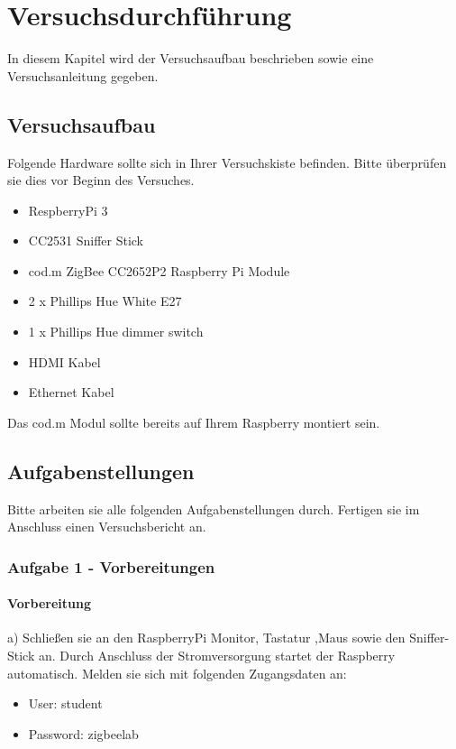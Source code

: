 \chapter{Versuchsdurchführung}

In diesem Kapitel wird der Versuchsaufbau beschrieben sowie eine Versuchsanleitung gegeben.

\section{Versuchsaufbau}

Folgende Hardware sollte sich in Ihrer Versuchskiste befinden. Bitte überprüfen sie dies vor Beginn des Versuches.

\begin{itemize}
    \item RespberryPi 3
    \item CC2531 Sniffer Stick
    \item cod.m ZigBee CC2652P2 Raspberry Pi Module
    \item 2 x Phillips Hue White E27
    \item 1 x Phillips Hue dimmer switch
    \item HDMI Kabel
    \item Ethernet Kabel
\end{itemize}

Das cod.m Modul sollte bereits auf Ihrem Raspberry montiert sein. 

\section{Aufgabenstellungen}

Bitte arbeiten sie alle folgenden Aufgabenstellungen durch. Fertigen sie im Anschluss einen Versuchsbericht an.

\subsection{Aufgabe 1 - Vorbereitungen}

\subsubsection{Vorbereitung}
a) Schließen sie an den RaspberryPi Monitor, Tastatur ,Maus sowie den Sniffer-Stick an. Durch Anschluss der
Stromversorgung startet der Raspberry automatisch. Melden sie sich mit folgenden Zugangsdaten an:

\begin{itemize}
    \item User: student 
    \item Password: zigbeelab
\end{itemize}


